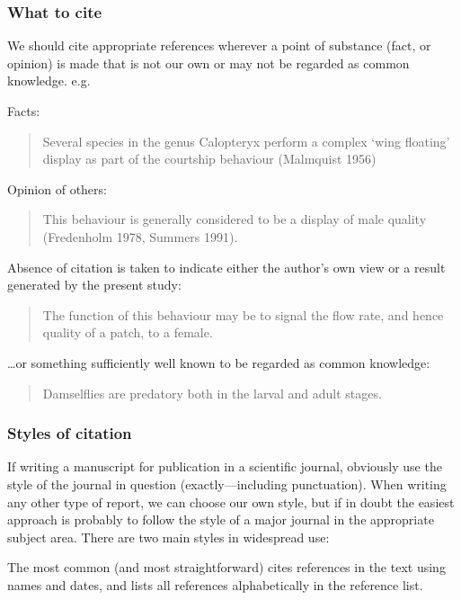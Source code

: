 \documentclass[
]{book}
\begin{document}
\hypertarget{what-to-cite}{%
\subsubsection{What to cite}\label{what-to-cite}}

We should cite appropriate references wherever a point of substance (fact, or opinion) is made that is not our own or may not be regarded as common knowledge. e.g.

Facts:

\begin{quote}
Several species in the genus Calopteryx perform a complex `wing floating' display as part of the courtship behaviour (Malmquist 1956)
\end{quote}

Opinion of others:

\begin{quote}
This behaviour is generally considered to be a display of male quality (Fredenholm 1978, Summers 1991).
\end{quote}

Absence of citation is taken to indicate either the author's own view or a result generated by the present study:

\begin{quote}
The function of this behaviour may be to signal the flow rate, and hence quality of a patch, to a female.
\end{quote}

\ldots or something sufficiently well known to be regarded as common knowledge:

\begin{quote}
Damselflies are predatory both in the larval and adult stages.
\end{quote}

\hypertarget{styles-of-citation}{%
\subsubsection{Styles of citation}\label{styles-of-citation}}

If writing a manuscript for publication in a scientific journal, obviously use the style of the journal in question (exactly---including punctuation). When writing any other type of report, we can choose our own style, but if in doubt the easiest approach is probably to follow the style of a major journal in the appropriate subject area. There are two main styles in widespread use:

The most common (and most straightforward) cites references in the text using names and dates, and lists all references alphabetically in the reference list.
\end{document}
